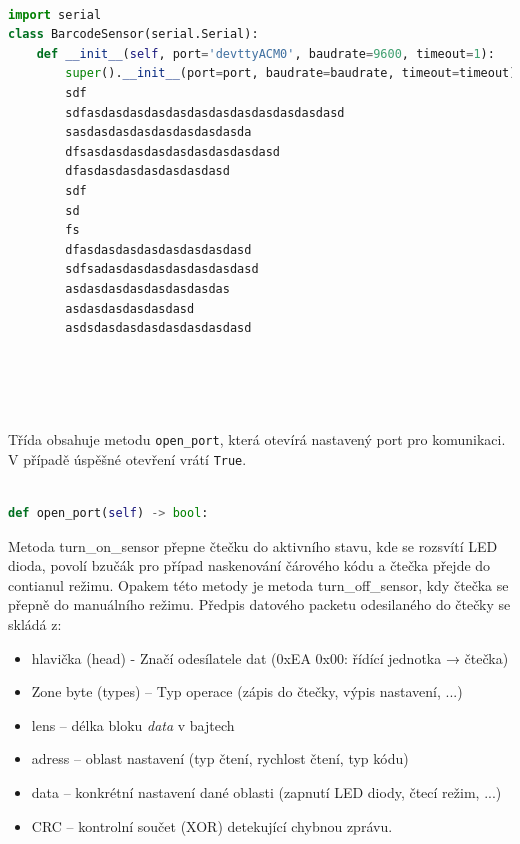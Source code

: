 \begin{lstlisting}[language=python,breaklines=true, frame=single]

import serial
class BarcodeSensor(serial.Serial):
    def __init__(self, port='devttyACM0', baudrate=9600, timeout=1):
        super().__init__(port=port, baudrate=baudrate, timeout=timeout)
        sdf
        sdfasdasdasdasdasdasdasdasdasdasdasdasd
        sasdasdasdasdasdasdasdasda
        dfsasdasdasdasdasdasdasdasdasd
        dfasdasdasdasdasdasdasd
        sdf
        sd
        fs
        dfasdasdasdasdasdasdasdasd
        sdfsadasdasdasdasdasdasdasd
        asdasdasdasdasdasdasdas
        asdasdasdasdasdasd
        asdsdasdasdasdasdasdasdasd



        
\end{lstlisting}
\bigskip
Třída obsahuje metodu \texttt{open\_port}, která otevírá nastavený port pro komunikaci. 
V případě úspěšné otevření vrátí \texttt{True}. 

\begin{lstlisting}[language=Python,breaklines=false, frame=single]

def open_port(self) -> bool:
\end{lstlisting}

\bigskip
Metoda turn\_on\_sensor přepne čtečku do aktivního stavu, kde se rozsvítí LED dioda, povolí bzučák pro případ naskenování čárového kódu a čtečka přejde do contianul režimu. Opakem této metody je metoda turn\_off\_sensor, kdy čtečka se přepně do manuálního režimu. Předpis datového packetu odesilaného do čtečky se skládá z:

\begin{itemize}
    \item hlavička (head) - Značí odesílatele dat (0xEA 0x00: řídící jednotka → čtečka)
    \item Zone byte (types) – Typ operace (zápis do čtečky, výpis nastavení, ...)
    \item lens – délka bloku \textit{data} v bajtech
    \item adress – oblast nastavení (typ čtení, rychlost čtení, typ kódu)
    \item data – konkrétní nastavení dané oblasti (zapnutí LED diody, čtecí režim, ...)
    \item CRC – kontrolní součet (XOR) detekující chybnou zprávu. 
\end{itemize}

